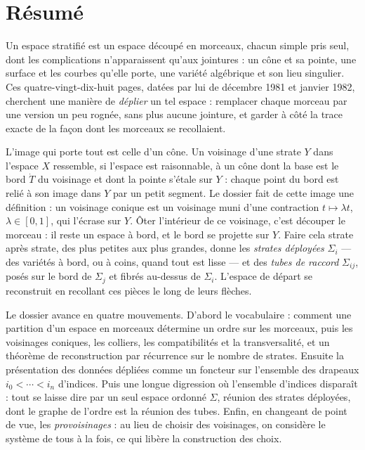 \documentclass[11pt,a4paper]{article}
\begin{document}
\section*{Résumé}

\begin{resume}
Un espace stratifié est un espace découpé en morceaux, chacun simple pris seul,
dont les complications n'apparaissent qu'aux jointures : un cône et sa pointe,
une surface et les courbes qu'elle porte, une variété algébrique et son lieu
singulier. Ces quatre-vingt-dix-huit pages, datées par lui de décembre 1981 et
janvier 1982, cherchent une manière de \emph{déplier} un tel espace : remplacer
chaque morceau par une version un peu rognée, sans plus aucune jointure, et
garder à côté la trace exacte de la façon dont les morceaux se recollaient.

L'image qui porte tout est celle d'un cône. Un voisinage d'une strate $Y$ dans
l'espace $X$ ressemble, si l'espace est raisonnable, à un cône dont la base est
le bord $\dot T$ du voisinage et dont la pointe s'étale sur $Y$ : chaque point du
bord est relié à son image dans $Y$ par un petit segment. Le dossier fait de
cette image une définition : un voisinage conique est un voisinage muni d'une
contraction $t \mapsto \lambda t$, $\lambda \in [0,1]$, qui l'écrase sur $Y$.
Ôter l'intérieur de ce voisinage, c'est découper le morceau : il reste un espace
à bord, et le bord se projette sur $Y$. Faire cela strate après strate, des plus
petites aux plus grandes, donne les \emph{strates déployées} $\Sigma_i$ — des
variétés à bord, ou à coins, quand tout est lisse — et des \emph{tubes de
raccord} $\Sigma_{ij}$, posés sur le bord de $\Sigma_j$ et fibrés au-dessus de
$\Sigma_i$. L'espace de départ se reconstruit en recollant ces pièces le long de
leurs flèches.

Le dossier avance en quatre mouvements. D'abord le vocabulaire : comment une
partition d'un espace en morceaux détermine un ordre sur les morceaux, puis les
voisinages coniques, les colliers, les compatibilités et la transversalité, et
un théorème de reconstruction par récurrence sur le nombre de strates. Ensuite
la présentation des données dépliées comme un foncteur sur l'ensemble des
drapeaux $i_0 < \cdots < i_n$ d'indices. Puis une longue digression où l'ensemble
d'indices disparaît : tout se laisse dire par un seul espace ordonné $\Sigma$,
réunion des strates déployées, dont le graphe de l'ordre est la réunion des
tubes. Enfin, en changeant de point de vue, les \emph{provoisinages} : au lieu de
choisir des voisinages, on considère le système de tous à la fois, ce qui libère
la construction des choix.


\end{resume}
\end{document}
